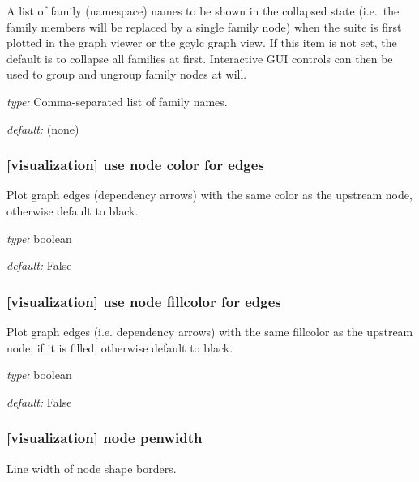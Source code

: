 A list of family (namespace) names to be shown in the collapsed state
(i.e.\ the family members will be replaced by a single family node) when
the suite is first plotted in the graph viewer or the gcylc graph view.
If this item is not set, the default is to collapse all families at first.
Interactive GUI controls can then be used to group and ungroup family
nodes at will.

\begin{myitemize}
    \item {\em type:} Comma-separated list of family names.
    \item {\em default:} (none)
\end{myitemize}

\subsubsection[use node color for edges]{[visualization] \textrightarrow use node color for edges}

Plot graph edges (dependency arrows) with the same color as the upstream
node, otherwise default to black.

\begin{myitemize}
    \item {\em type:} boolean
    \item {\em default:} False
\end{myitemize}

\subsubsection[use node fillcolor for edges]{[visualization] \textrightarrow use node fillcolor for edges}

Plot graph edges (i.e. dependency arrows) with the same fillcolor as the
upstream node, if it is filled, otherwise default to black.

\begin{myitemize}
    \item {\em type:} boolean
    \item {\em default:} False
\end{myitemize}

\subsubsection[node penwidth]{[visualization] \textrightarrow node penwidth}

Line width of node shape borders.

